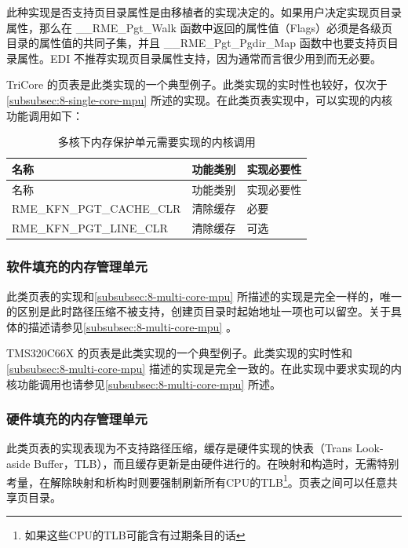 此种实现是否支持页目录属性是由移植者的实现决定的。如果用户决定实现页目录属性，那么在 \_\_RME\_Pgt\_Walk 函数中返回的属性值（Flags）必须是各级页目录的属性值的共同子集，并且 \_\_RME\_Pgt\_Pgdir\_Map 函数中也要支持页目录属性。EDI 不推荐实现页目录属性支持，因为通常而言很少用到而无必要。

TriCore 的页表是此类实现的一个典型例子。此类实现的实时性也较好，仅次于\ref{subsubsec:8-single-core-mpu}
所述的实现。在此类页表实现中，可以实现的内核功能调用如下：

\begin{xltabular}{\textwidth}{@{}>{\hsize\raggedright\arraybackslash}X>{\hsize\raggedright\arraybackslash}X>{\hsize\raggedright\arraybackslash}X@{}}
\caption{多核下内存保护单元需要实现的内核调用}\label{tab:8-3-kernel-calls-required-by-multi-core-mpu}\\
\toprule
名称 & 功能类别 & 实现必要性\tabularnewline
\endfirsthead
\toprule
名称 & 功能类别 & 实现必要性\tabularnewline
\midrule
\endhead
\bottomrule
\endlastfoot
RME\_KFN\_PGT\_CACHE\_CLR & 清除缓存 & 必要\tabularnewline
RME\_KFN\_PGT\_LINE\_CLR & 清除缓存 & 可选\tabularnewline
\end{xltabular}

\subsubsection{软件填充的内存管理单元}\label{subsubsec:8-software-filled-mmu}

此类页表的实现和\ref{subsubsec:8-multi-core-mpu}
所描述的实现是完全一样的，唯一的区别是此时路径压缩不被支持，创建页目录时起始地址一项也可以留空。关于具体的描述请参见\ref{subsubsec:8-multi-core-mpu}
。

TMS320C66X 的页表是此类实现的一个典型例子。此类实现的实时性和\ref{subsubsec:8-multi-core-mpu}
描述的实现是完全一致的。在此实现中要求实现的内核功能调用也请参见\ref{subsubsec:8-multi-core-mpu}
所述。

\subsubsection{硬件填充的内存管理单元}\label{subsubsec:8-hardware-filled-mmu}

此类页表的实现表现为不支持路径压缩，缓存是硬件实现的快表（Trans
Look-aside
Buffer，TLB），而且缓存更新是由硬件进行的。在映射和构造时，无需特别考量，在解除映射和析构时则要强制刷新所有CPU的TLB\footnote{如果这些CPU的TLB可能含有过期条目的话}。页表之间可以任意共享页目录。

